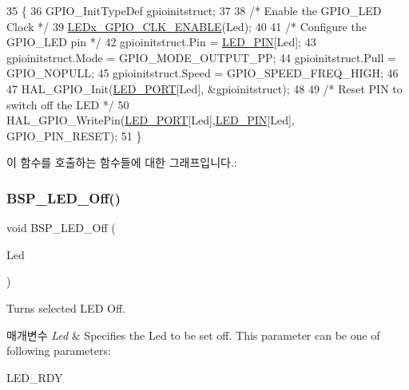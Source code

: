 \begin{DoxyCode}
35 \{
36   GPIO\_InitTypeDef  gpioinitstruct;
37   
38   \textcolor{comment}{/* Enable the GPIO\_LED Clock */}
39   \mbox{\hyperlink{_lory_s_d_k__hw__conf_8h_a32faaf3f04d44e7eddce1d781587fc57}{LEDx\_GPIO\_CLK\_ENABLE}}(Led);
40 
41   \textcolor{comment}{/* Configure the GPIO\_LED pin */}
42   gpioinitstruct.Pin    = \mbox{\hyperlink{bsp_8c_a51722a2d3aff3970f123a94ac62b908f}{LED\_PIN}}[Led];
43   gpioinitstruct.Mode   = GPIO\_MODE\_OUTPUT\_PP;
44   gpioinitstruct.Pull   = GPIO\_NOPULL;
45   gpioinitstruct.Speed  = GPIO\_SPEED\_FREQ\_HIGH;
46   
47   HAL\_GPIO\_Init(\mbox{\hyperlink{bsp_8c_a1127c0cf12e4ec7a66f2a64cd7407218}{LED\_PORT}}[Led], &gpioinitstruct);
48 
49   \textcolor{comment}{/* Reset PIN to switch off the LED */}
50   HAL\_GPIO\_WritePin(\mbox{\hyperlink{bsp_8c_a1127c0cf12e4ec7a66f2a64cd7407218}{LED\_PORT}}[Led],\mbox{\hyperlink{bsp_8c_a51722a2d3aff3970f123a94ac62b908f}{LED\_PIN}}[Led], GPIO\_PIN\_RESET);
51 \}
\end{DoxyCode}
이 함수를 호출하는 함수들에 대한 그래프입니다.\+:
\mbox{\label{group___lory_s_d_k___l_e_d___functions_gaef268680154ca15c45066d64d41f9467}} 
\subsubsection{\texorpdfstring{B\+S\+P\+\_\+\+L\+E\+D\+\_\+\+Off()}{BSP\_LED\_Off()}}
{\footnotesize\ttfamily void B\+S\+P\+\_\+\+L\+E\+D\+\_\+\+Off (\begin{DoxyParamCaption}\item[{\mbox{\hyperlink{_lory_s_d_k__hw__conf_8h_aa059704b7ca945eb9c1e7f2c3d03fecd}{Led\+\_\+\+Type\+Def}}}]{Led }\end{DoxyParamCaption})}



Turns selected L\+ED Off. 


\begin{DoxyParams}{매개변수}
{\em Led} & Specifies the Led to be set off. This parameter can be one of following parameters\+: \begin{DoxyItemize}
\item L\+E\+D\+\_\+\+R\+DY \end{DoxyItemize}
\\
\hline
\end{DoxyParams}

